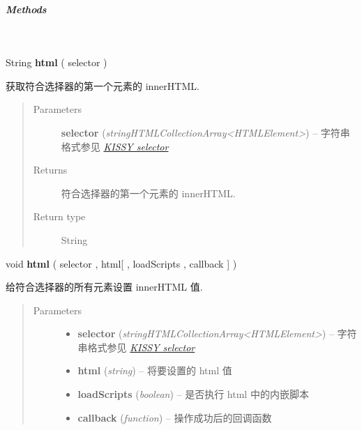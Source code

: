 \documentclass[letterpaper,10pt,english]{sphinxmanual}
\begin{document}
\subparagraph{Methods}
\label{api/core/dom/html:methods}

\begin{fulllineitems}
\label{api/core/dom/html:DOM.html}~
\begin{DUlineblock}{0em}
\item[] String \textbf{html} ( selector )
\item[] 获取符合选择器的第一个元素的 innerHTML.
\end{DUlineblock}
\begin{quote}\begin{description}
\item[{Parameters}] \leavevmode
\textbf{selector} (\emph{string\textbar{}HTMLCollection\textbar{}Array\textless{}HTMLElement\textgreater{}}) -- 字符串格式参见 {\hyperref[api/core/dom/selector:dom-selector]{\emph{KISSY selector}}}

\item[{Returns}] \leavevmode
符合选择器的第一个元素的 innerHTML.

\item[{Return type}] \leavevmode
String

\end{description}\end{quote}

\begin{DUlineblock}{0em}
\item[] void \textbf{html} ( selector , html{[} , loadScripts , callback {]} )
\item[] 给符合选择器的所有元素设置 innerHTML 值.
\end{DUlineblock}
\begin{quote}\begin{description}
\item[{Parameters}] \leavevmode\begin{itemize}
\item {}
\textbf{selector} (\emph{string\textbar{}HTMLCollection\textbar{}Array\textless{}HTMLElement\textgreater{}}) -- 字符串格式参见 {\hyperref[api/core/dom/selector:dom-selector]{\emph{KISSY selector}}}

\item {}
\textbf{html} (\emph{string}) -- 将要设置的 html 值

\item {}
\textbf{loadScripts} (\emph{boolean}) -- 是否执行 html 中的内嵌脚本

\item {}
\textbf{callback} (\emph{function}) -- 操作成功后的回调函数

\end{itemize}

\end{description}\end{quote}

\end{fulllineitems}
\end{document}
